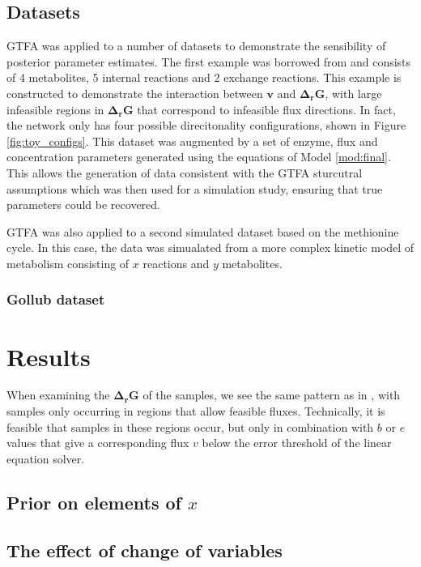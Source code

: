 \documentclass[10pt,letterpaper]{article}
\newcommand{\dgr}{\Delta_rG}
\newcommand{\bdgr}{\mathbf{\dgr}}
\newcommand{\bv}{\mathbf{v}}
\begin{document}
\subsection{Datasets}

GTFA was applied to a number of datasets to demonstrate the sensibility of posterior parameter estimates.
The first example was borrowed from \cite{PTA} and consists of 4 metabolites, 5 internal reactions and 2 exchange reactions.
This example is constructed to demonstrate the interaction between $\bv$ and $\bdgr$, with large infeasible regions in $\bdgr$ that correspond to infeasible flux directions.
In fact, the network only has four possible direcitonality configurations, shown in Figure \ref{fig:toy_configs}.
This dataset was augmented by a set of enzyme, flux and concentration parameters generated using the equations of Model \ref{mod:final}.
This allows the generation of data consistent with the GTFA sturcutral assumptions which was then used for a simulation study, ensuring that true parameters could be recovered.

GTFA was also applied to a second simulated dataset based on the methionine cycle.
In this case, the data was simualated from a more complex kinetic model of metabolism consisting of $x$ reactions and $y$ metabolites. %



\subsubsection{Gollub dataset}

\section*{Results}
When examining the $\bdgr$ of the samples, we see the same pattern as in \cite{PTA}, with samples only occurring in regions that allow feasible fluxes.
Technically, it is feasible that samples in these regions occur, but only in combination with $b$ or $e$ values that give a corresponding flux $v$ below the error threshold of the linear equation solver.

\subsection{Prior on elements of $x$}
\label{sec:x_prior}

\subsection{The effect of change of variables}
\end{document}
